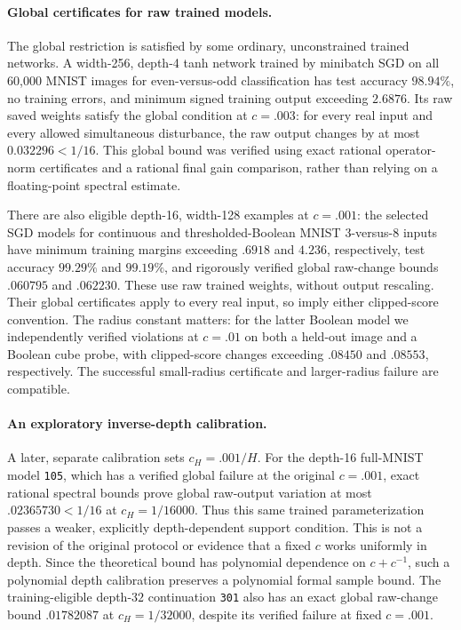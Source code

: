 \paragraph{Global certificates for raw trained models.}
The global restriction is satisfied by some ordinary, unconstrained trained networks.  A width-256, depth-4 tanh network trained by minibatch SGD on all 60,000 MNIST images for even-versus-odd classification has test accuracy $98.94\%$, no training errors, and minimum signed training output exceeding $2.6876$.  Its raw saved weights satisfy the global condition at $c=.003$: for every real input and every allowed simultaneous disturbance, the raw output changes by at most $0.032296<1/16$.  This global bound was verified using exact rational operator-norm certificates and a rational final gain comparison, rather than relying on a floating-point spectral estimate.

There are also eligible depth-16, width-128 examples at $c=.001$: the selected SGD models for continuous and thresholded-Boolean MNIST 3-versus-8 inputs have minimum training margins exceeding $.6918$ and $4.236$, respectively, test accuracy $99.29\%$ and $99.19\%$, and rigorously verified global raw-change bounds $.060795$ and $.062230$.  These use raw trained weights, without output rescaling.  Their global certificates apply to every real input, so imply either clipped-score convention.  The radius constant matters: for the latter Boolean model we independently verified violations at $c=.01$ on both a held-out image and a Boolean cube probe, with clipped-score changes exceeding $.08450$ and $.08553$, respectively.  The successful small-radius certificate and larger-radius failure are compatible.

\paragraph{An exploratory inverse-depth calibration.}
A later, separate calibration sets $c_H=.001/H$.  For the depth-16 full-MNIST model \texttt{105}, which has a verified global failure at the original $c=.001$, exact rational spectral bounds prove global raw-output variation at most $.02365730<1/16$ at $c_H=1/16000$.  Thus this same trained parameterization passes a weaker, explicitly depth-dependent support condition.  This is not a revision of the original protocol or evidence that a fixed $c$ works uniformly in depth.  Since the theoretical bound has polynomial dependence on $c+c^{-1}$, such a polynomial depth calibration preserves a polynomial formal sample bound.  The training-eligible depth-$32$ continuation \texttt{301} also has an exact global raw-change bound $.01782087$ at $c_H=1/32000$, despite its verified failure at fixed $c=.001$.

